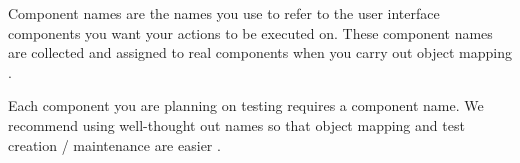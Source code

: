Component names \bxpref{} are the names you use to refer to the user interface components you want your actions to be executed on. These component names are collected and assigned to real components when you carry out object mapping . 


Each component you are planning on testing requires a component name. We recommend using well-thought out names so that object mapping and test creation / maintenance are easier .
